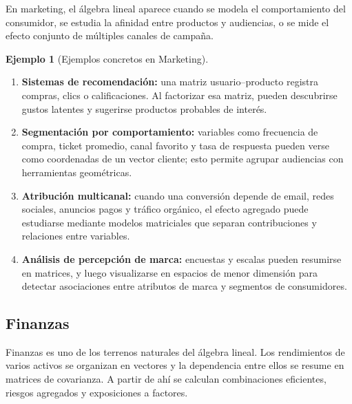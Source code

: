 \documentclass[10pt,a4paper,oneside]{article}
\theoremstyle{plain}
\theoremstyle{definition}
\newtheorem{example}[theorem]{Ejemplo}
\theoremstyle{remark}
\begin{document}
En marketing, el álgebra lineal aparece cuando se modela el comportamiento del consumidor, se estudia la afinidad entre productos y audiencias, o se mide el efecto conjunto de múltiples canales de campaña.

\begin{example}[Ejemplos concretos en Marketing]
\begin{enumerate}[label=\textup{(\arabic*)}]
\item \textbf{Sistemas de recomendación:} una matriz usuario--producto registra compras, clics o calificaciones. Al factorizar esa matriz, pueden descubrirse gustos latentes y sugerirse productos probables de interés.
\item \textbf{Segmentación por comportamiento:} variables como frecuencia de compra, ticket promedio, canal favorito y tasa de respuesta pueden verse como coordenadas de un vector cliente; esto permite agrupar audiencias con herramientas geométricas.
\item \textbf{Atribución multicanal:} cuando una conversión depende de email, redes sociales, anuncios pagos y tráfico orgánico, el efecto agregado puede estudiarse mediante modelos matriciales que separan contribuciones y relaciones entre variables.
\item \textbf{Análisis de percepción de marca:} encuestas y escalas pueden resumirse en matrices, y luego visualizarse en espacios de menor dimensión para detectar asociaciones entre atributos de marca y segmentos de consumidores.
\end{enumerate}
\end{example}

\subsection{Finanzas}

Finanzas es uno de los terrenos naturales del álgebra lineal. Los rendimientos de varios activos se organizan en vectores y la dependencia entre ellos se resume en matrices de covarianza. A partir de ahí se calculan combinaciones eficientes, riesgos agregados y exposiciones a factores.
\end{document}
